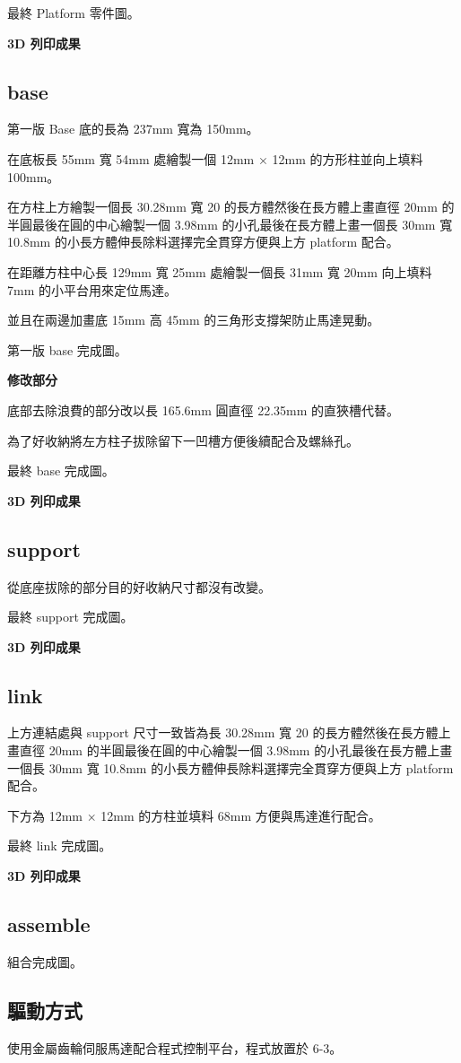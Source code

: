 \newpage


最終 Platform 零件圖。

\textbf{3D 列印成果}

\subsection*{base}

第一版 Base 底的長為 237mm 寬為 150mm。

在底板長 55mm 寬 54mm 處繪製一個 12mm $\times$ 12mm 的方形柱並向上填料 100mm。

在方柱上方繪製一個長 30.28mm 寬 20 的長方體然後在長方體上畫直徑 20mm 的半圓最後在圓的中心繪製一個 3.98mm 的小孔最後在長方體上畫一個長 30mm 寬 10.8mm 的小長方體伸長除料選擇完全貫穿方便與上方 platform 配合。

在距離方柱中心長 129mm 寬 25mm 處繪製一個長 31mm 寬 20mm 向上填料 7mm 的小平台用來定位馬達。

並且在兩邊加畫底 15mm 高 45mm 的三角形支撐架防止馬達晃動。

第一版 base 完成圖。

\textbf{修改部分}

底部去除浪費的部分改以長 165.6mm 圓直徑 22.35mm 的直狹槽代替。

為了好收納將左方柱子拔除留下一凹槽方便後續配合及螺絲孔。

最終 base 完成圖。

\textbf{3D 列印成果}

\subsection*{support}

從底座拔除的部分目的好收納尺寸都沒有改變。

最終 support 完成圖。

\textbf{3D 列印成果}

\subsection*{link}

上方連結處與 support 尺寸一致皆為長 30.28mm 寬 20 的長方體然後在長方體上畫直徑 20mm 的半圓最後在圓的中心繪製一個 3.98mm 的小孔最後在長方體上畫一個長 30mm 寬 10.8mm 的小長方體伸長除料選擇完全貫穿方便與上方 platform 配合。

下方為 12mm $\times$ 12mm 的方柱並填料 68mm 方便與馬達進行配合。

最終 link 完成圖。

\textbf{3D 列印成果}

\subsection*{assemble}

組合完成圖。

\subsection*{驅動方式}

使用金屬齒輪伺服馬達配合程式控制平台，程式放置於 6-3。


